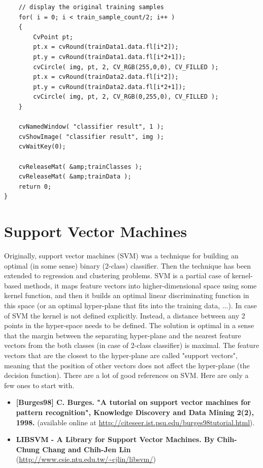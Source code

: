 \begin{lstlisting}
    // display the original training samples
    for( i = 0; i < train_sample_count/2; i++ )
    {
        CvPoint pt;
        pt.x = cvRound(trainData1.data.fl[i*2]);
        pt.y = cvRound(trainData1.data.fl[i*2+1]);
        cvCircle( img, pt, 2, CV_RGB(255,0,0), CV_FILLED );
        pt.x = cvRound(trainData2.data.fl[i*2]);
        pt.y = cvRound(trainData2.data.fl[i*2+1]);
        cvCircle( img, pt, 2, CV_RGB(0,255,0), CV_FILLED );
    }

    cvNamedWindow( "classifier result", 1 );
    cvShowImage( "classifier result", img );
    cvWaitKey(0);

    cvReleaseMat( &amp;trainClasses );
    cvReleaseMat( &amp;trainData );
    return 0;
}
\end{lstlisting}


\section{Support Vector Machines}

Originally, support vector machines (SVM) was a technique for building an optimal (in some sense) binary (2-class) classifier. Then the technique has been extended to regression and clustering problems. SVM is a partial case of kernel-based methods, it maps feature vectors into higher-dimensional space using some kernel function, and then it builds an optimal linear discriminating function in this space (or an optimal hyper-plane that fits into the training data, ...). In case of SVM the kernel is not defined explicitly. Instead, a distance between any 2 points in the hyper-space needs to be defined.
\newline
\newline
The solution is optimal in a sense that the margin between the separating hyper-plane and the nearest feature vectors from the both classes (in case of 2-class classifier) is maximal. The feature vectors that are the closest to the hyper-plane are called "support vectors", meaning that the position of other vectors does not affect the hyper-plane (the decision function).
\newline
\newline
There are a lot of good references on SVM. Here are only a few ones to start with.
\begin{itemize}
\item \textbf{[Burges98] C. Burges. "A tutorial on support vector machines for pattern recognition", Knowledge Discovery and Data Mining 2(2), 1998.} (available online at \url{http://citeseer.ist.psu.edu/burges98tutorial.html}).
\item \textbf{LIBSVM - A Library for Support Vector Machines. By Chih-Chung Chang and Chih-Jen Lin} (\url{http://www.csie.ntu.edu.tw/~cjlin/libsvm/})
\end{itemize}

